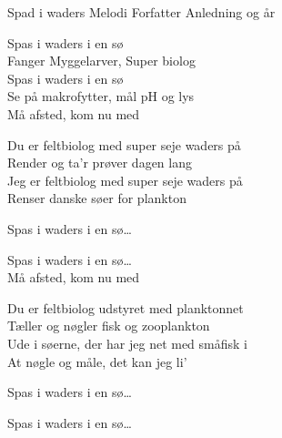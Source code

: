 \begin{song}{Spad i waders}
  {} %
  {Melodi} %
  {Forfatter} %
  {Anledning og år} %
  {\NotCCLIed} %

  \begin{SBChorus}
Spas i waders i en sø\\
Fanger Myggelarver, Super biolog\\
Spas i waders i en sø\\
Se på makrofytter, mål pH og lys\\
Må afsted, kom nu med
  \end{SBChorus}

  \begin{SBVerse}
Du er feltbiolog med super seje waders på\\
Render og ta'r prøver dagen lang\\
Jeg er feltbiolog med super seje waders på\\
Renser danske søer for plankton
  \end{SBVerse}

  \begin{SBChorus}
Spas i waders i en sø\ldots
  \end{SBChorus}

  \begin{SBChorus}
Spas i waders i en sø\ldots\\
Må afsted, kom nu med
  \end{SBChorus}

  \begin{SBVerse}
Du er feltbiolog udstyret med planktonnet\\
Tæller og nøgler fisk og zooplankton\\
Ude i søerne, der har jeg net med småfisk i\\
At nøgle og måle, det kan jeg li'
  \end{SBVerse}

  \begin{SBChorus}
Spas i waders i en sø\ldots
  \end{SBChorus}

  \begin{SBChorus}
Spas i waders i en sø\ldots
  \end{SBChorus}


\end{song}
